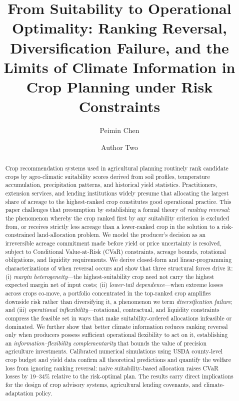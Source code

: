\documentclass[12pt,review,authoryear]{elsarticle}
\numberwithin{equation}{section}
\begin{document}
\begin{frontmatter}

\title{From Suitability to Operational Optimality: Ranking Reversal,
Diversification Failure, and the Limits of Climate Information
in Crop Planning under Risk Constraints}

\author[inst1]{Peimin Chen}
\author[inst1]{Author Two}

\address[inst1]{Business Analytics Programme, Faculty of Business and Management,
Beijing Normal--Hong Kong Baptist University (UIC), Zhuhai, Guangdong,
519087, China}

\begin{abstract}
Crop recommendation systems used in agricultural planning routinely rank
candidate crops by agro-climatic suitability scores derived from soil
profiles, temperature accumulation, precipitation patterns, and historical
yield statistics.  Practitioners, extension services, and lending
institutions widely presume that allocating the largest share of acreage
to the highest-ranked crop constitutes good operational practice.  This
paper challenges that presumption by establishing a formal theory of
\emph{ranking reversal}: the phenomenon whereby the crop ranked first by
any suitability criterion is excluded from, or receives strictly less
acreage than a lower-ranked crop in the solution to a risk-constrained
land-allocation problem.  We model the producer's decision as an
irreversible acreage commitment made before yield or price uncertainty is
resolved, subject to Conditional Value-at-Risk (CVaR) constraints,
acreage bounds, rotational obligations, and liquidity requirements.  We
derive closed-form and linear-programming characterizations of when
reversal occurs and show that three structural forces drive it: (i)
\emph{margin heterogeneity}---the highest-suitability crop need not carry
the highest expected margin net of input costs; (ii) \emph{lower-tail
dependence}---when extreme losses across crops co-move, a portfolio
concentrated in the top-ranked crop amplifies downside risk rather than
diversifying it, a phenomenon we term \emph{diversification failure}; and
(iii) \emph{operational inflexibility}---rotational, contractual, and
liquidity constraints compress the feasible set in ways that make
suitability-ordered allocations infeasible or dominated.  We further show
that better climate information reduces ranking reversal only when
producers possess sufficient operational flexibility to act on it,
establishing an \emph{information--flexibility complementarity} that
bounds the value of precision agriculture investments.  Calibrated
numerical simulations using USDA county-level crop budget and yield data
confirm all theoretical predictions and quantify the welfare loss from
ignoring ranking reversal: naive suitability-based allocation raises CVaR
losses by 19--34\% relative to the risk-optimal plan.  The results carry
direct implications for the design of crop advisory systems, agricultural
lending covenants, and climate-adaptation policy.
\end{abstract}


\end{frontmatter}
\end{document}
